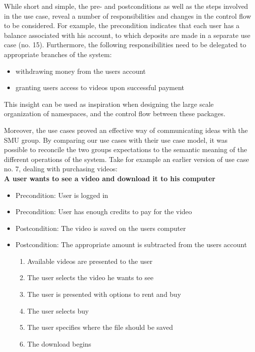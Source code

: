 While short and simple, the pre- and postconditions as well as the steps involved in the use case, reveal a number of responsibilities and changes in the control flow to be considered. For example, the precondition indicates that each user has a balance associated with his account, to which deposits are made  in a separate use case (no. 15). Furthermore, the following responsibilities need to be delegated to appropriate branches of the system:

\begin{itemize}
\item withdrawing money from the users account
\item granting users access to videos upon successful payment
\end{itemize}

This insight can be used as inspiration when designing the large scale organization of namespaces, and the control flow between these packages.

Moreover, the use cases proved an effective way of communicating ideas with the SMU group. By comparing our use cases with their use case model, it was possible to reconcile the two groups expectations to the semantic meaning of the different operations of the system. Take for example an earlier version of use case no. 7, dealing with purchasing videos:\\

\textbf{A user wants to see a video and download it to his computer}
\begin{itemize}
\item Precondition: User is logged in
\item Precondition: User has enough credits to pay for the video
\item Postcondition: The video is saved on the users computer
\item Postcondition: The appropriate amount is subtracted from the users account
\begin{enumerate}
\item Available videos are presented to the user
\item The user selects the video he wants to see
\item The user is presented with options to rent and buy
\item The user selects buy
\item The user specifies where the file should be saved
\item The download begins
\end{enumerate}
\end{itemize}

